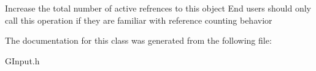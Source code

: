 Increase the total number of active refrences to this object End users should only call this operation if they are familiar with reference counting behavior 

The documentation for this class was generated from the following file\+:\begin{DoxyCompactItemize}
\item 
G\+Input.\+h\end{DoxyCompactItemize}
